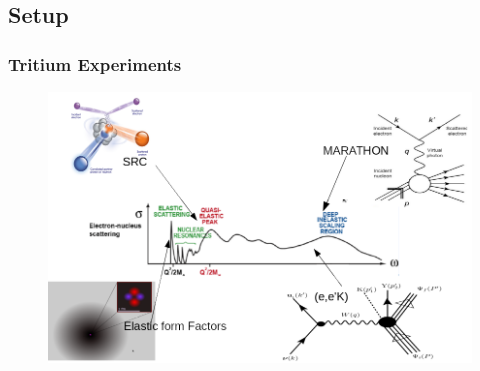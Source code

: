 \documentclass{beamer}
\begin{document}
\subsection{Setup}
\begin{frame}
\frametitle{Tritium Experiments}
	\begin{figure}
	\includegraphics[width =12cm]{../images/tritium_ov}
\end{figure}
\end{frame}
\end{document}
